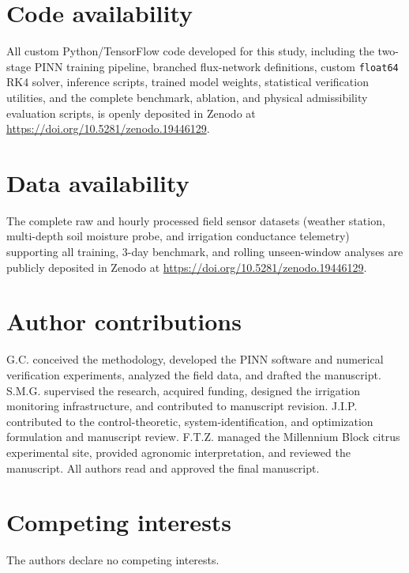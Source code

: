 \documentclass[pdflatex,sn-nature]{sn-jnl}%
\theoremstyle{thmstyleone}%
\theoremstyle{thmstyletwo}%
\theoremstyle{thmstylethree}%
\begin{document}
{\color{blue}\section*{Code availability}
All custom Python/TensorFlow code developed for this study, including the two-stage PINN training pipeline, branched flux-network definitions, custom \texttt{float64} RK4 solver, inference scripts, trained model weights, statistical verification utilities, and the complete benchmark, ablation, and physical admissibility evaluation scripts, is openly deposited in Zenodo at \url{https://doi.org/10.5281/zenodo.19446129}.

\section*{Data availability}
The complete raw and hourly processed field sensor datasets (weather station, multi-depth soil moisture probe, and irrigation conductance telemetry) supporting all training, 3-day benchmark, and rolling unseen-window analyses are publicly deposited in Zenodo at \url{https://doi.org/10.5281/zenodo.19446129}.

\section*{Author contributions}
G.C. conceived the methodology, developed the PINN software and numerical verification experiments, analyzed the field data, and drafted the manuscript. S.M.G. supervised the research, acquired funding, designed the irrigation monitoring infrastructure, and contributed to manuscript revision. J.I.P. contributed to the control-theoretic, system-identification, and optimization formulation and manuscript review. F.T.Z. managed the Millennium Block citrus experimental site, provided agronomic interpretation, and reviewed the manuscript. All authors read and approved the final manuscript.

\section*{Competing interests}
The authors declare no competing interests.}

\end{document}
